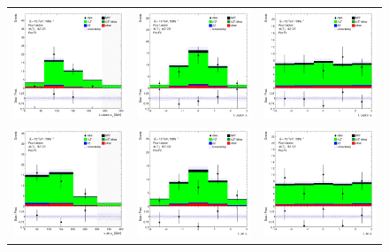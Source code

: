 \begin{figure}[htbp]
\begin{tabular}{ccc}
    \includegraphics[width=.25\textwidth]{figures/PreFitPlots/lep4_ttZ_4T_L_lepton_pt.png} &
    \includegraphics[width=.25\textwidth]{figures/PreFitPlots/lep4_ttZ_4T_L_lepton_eta.png} &
    \includegraphics[width=.25\textwidth]{figures/PreFitPlots/lep4_ttZ_4T_L_lepton_phi.png} \\
    \includegraphics[width=.25\textwidth]{figures/PreFitPlots/lep4_ttZ_4T_LJet_pt.png} &
    \includegraphics[width=.25\textwidth]{figures/PreFitPlots/lep4_ttZ_4T_LJet_eta.png} &
    \includegraphics[width=.25\textwidth]{figures/PreFitPlots/lep4_ttZ_4T_LJet_phi.png} \\


\end{tabular}
\end{figure}
